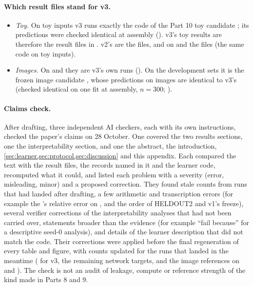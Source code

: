 \paragraph{Which result files stand for v3.}
\begin{itemize}
\item \emph{Toy.} On toy inputs v3 runs exactly the code of the Part 10 toy candidate ; its predictions were checked identical at assembly (). v3's toy results are therefore the  result files in . v2's are the  files, and on  and  the  files (the same code on toy inputs).
\item \emph{Images.} On  and  they are v3's own runs (). On the development sets it is the frozen image candidate , whose predictions on images are identical to v3's (checked identical on one  fit at assembly, $n=300$; ).
\end{itemize}

\paragraph{Claims check.} After drafting, three independent AI checkers, each with its own instructions, checked the paper's claims on 28 October. One covered the two results sections, one the interpretability section, and one the abstract, the introduction, \cref{sec:learner,sec:protocol,sec:discussion} and this appendix. Each compared the text with the result files, the records named in it and the learner code, recomputed what it could, and listed each problem with a severity (error, misleading, minor) and a proposed correction. They found stale counts from runs that had landed after drafting, a few arithmetic and transcription errors (for example the 's relative error on , and the order of HELDOUT2 and v1's freeze), several verifier corrections of the interpretability analyses that had not been carried over, statements broader than the evidence (for example ``fail because'' for a descriptive seed-0 analysis), and details of the learner description that did not match the code. Their corrections were applied before the final regeneration of every table and figure, with counts updated for the runs that landed in the meantime ( for v3, the remaining  network targets, and the image references on  and ). The check is not an audit of leakage, compute or reference strength of the kind made in Parts 8 and 9.

